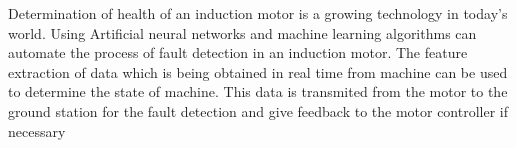 \setcounter{page}{1}
\thispagestyle{empty}
Determination of health of an induction motor is a growing technology in today’s world. Using Artificial neural networks and machine learning algorithms can automate the process of fault detection in an induction motor. The feature extraction of data which is being obtained in real time from machine can be used to determine the state of machine. This data is transmited from the motor to the ground station for the fault detection and give feedback to the motor controller if necessary
